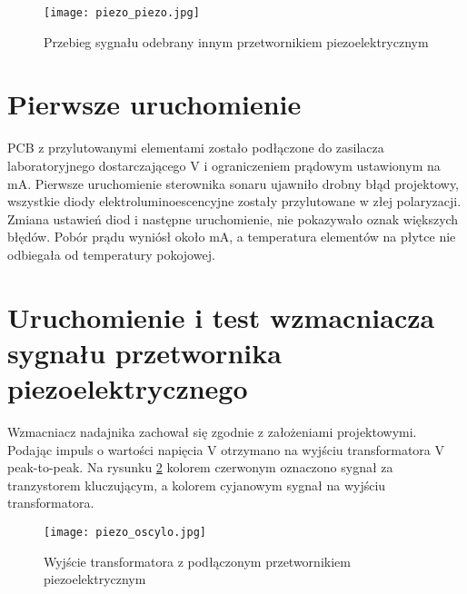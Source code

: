 \begin{figure}[!ht]
    \centering
    \texttt{[image: piezo\_piezo.jpg]}
    \caption{Przebieg sygnału odebrany innym przetwornikiem piezoelektrycznym}
    \label{fig:oscylo_piezo}
\end{figure}

\section{Pierwsze uruchomienie}
PCB z przylutowanymi elementami zostało podłączone do zasilacza laboratoryjnego dostarczającego \unit[5]{V} i ograniczeniem prądowym ustawionym na \unit[100]{mA}. 
Pierwsze uruchomienie sterownika sonaru ujawniło drobny błąd projektowy, wszystkie diody elektroluminoescencyjne zostały przylutowane w złej polaryzacji.
Zmiana ustawień diod i następne uruchomienie, nie pokazywało oznak większych błędów. Pobór prądu wyniósł około \unit[30]{mA}, a temperatura elementów na 
płytce nie odbiegała od temperatury pokojowej.

\section{Uruchomienie i test wzmacniacza sygnału przetwornika piezoelektrycznego}
Wzmacniacz nadajnika zachował się zgodnie z założeniami projektowymi. Podając impuls o wartości napięcia \unit[5]{V} otrzymano na wyjściu transformatora \unit[80]{V} peak-to-peak. 
Na rysunku \ref{fig:amplifier} kolorem czerwonym oznaczono sygnał za tranzystorem kluczującym, a kolorem cyjanowym sygnał na wyjściu transformatora.

\begin{figure}[!ht]
    \centering
    \texttt{[image: piezo\_oscylo.jpg]}
    \caption{Wyjście transformatora z podłączonym przetwornikiem piezoelektrycznym}
    \label{fig:amplifier}
\end{figure}

